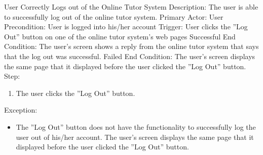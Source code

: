     \begin{section}{User Correctly Logs out of the Online Tutor System}
        Description: The user is able to successfully log out of the online tutor system. \newline
        Primary Actor: User \newline
        Precondition: User is logged into his/her account \newline 
        Trigger: User clicks the ''Log Out'' button on one of the online tutor system's web pages \newline
        Successful End Condition: The user's screen shows a reply from the online tutor system that says that the log out was successful. \newline
        Failed End Condition: The user's screen displays the same page that it displayed before the user clicked the ''Log Out'' button. \newline
        \newline
        Step:
        \begin{enumerate}
            \item{The user clicks the ''Log Out'' button.}
        \end{enumerate}
        Exception:
        \begin{itemize}
            \item{The ''Log Out'' button does not have the functionality to successfully log the user out of his/her account.  The user's screen displays the same page that it displayed before the user clicked the ''Log Out'' button.}
        \end{itemize}
    \end{section}
    
